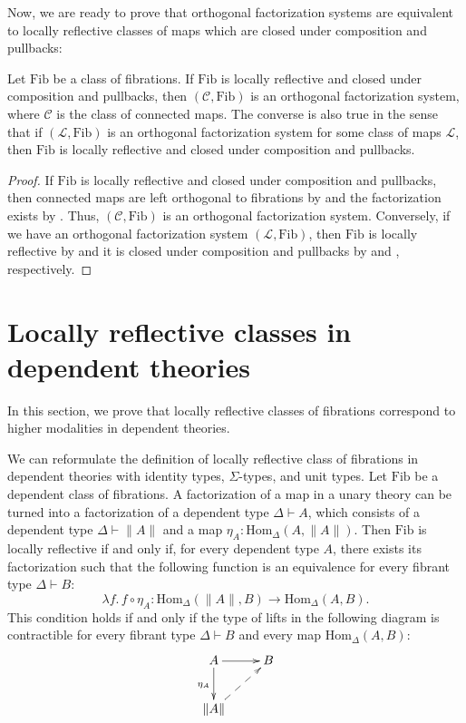 \documentclass[reqno]{mscs}
\newcommand{\ob}{}
\newcommand{\fs}[1]{\mathrm{#1}}
\newcommand{\Hom}{\fs{Hom}}
\newcommand{\Fib}{\fs{Fib}}
\numberwithin{figure}{section}
\begin{document}
Now, we are ready to prove that orthogonal factorization systems are equivalent to locally reflective classes of maps which are closed under composition and pullbacks:

\begin{thm}
Let $\Fib$ be a class of fibrations.
If $\Fib$ is locally reflective and closed under composition and pullbacks, then $(\mathcal{C},\Fib)$ is an orthogonal factorization system, where $\mathcal{C}$ is the class of connected maps.
The converse is also true in the sense that if $(\mathcal{L},\Fib)$ is an orthogonal factorization system for some class of maps $\mathcal{L}$, then $\Fib$ is locally reflective and closed under composition and pullbacks.
\end{thm}
\begin{proof}
If $\Fib$ is locally reflective and closed under composition and pullbacks, then connected maps are left orthogonal to fibrations by  and the factorization exists by .
Thus, $(\mathcal{C},\Fib)$ is an orthogonal factorization system.
Conversely, if we have an orthogonal factorization system $(\mathcal{L},\Fib)$, then $\Fib$ is locally reflective by  and it is closed under composition and pullbacks by  and , respectively.
\end{proof}

\section{Locally reflective classes in dependent theories}
\label{sec:refl-fib-dep}

In this section, we prove that locally reflective classes of fibrations correspond to higher modalities in dependent theories.

We can reformulate the definition of locally reflective class of fibrations in dependent theories with identity types, $\Sigma$-types, and unit types.
Let $\Fib$ be a dependent class of fibrations.
A factorization of a map in a unary theory can be turned into a factorization of a dependent type $\Delta \vdash A \ob$, which consists of a dependent type $\Delta \vdash \| A \| \ob$ and a map $\eta_A : \Hom_\Delta(A, \| A \|)$.
Then $\Fib$ is locally reflective if and only if, for every dependent type $A$, there exists its factorization such that the following function is an equivalence for every fibrant type $\Delta \vdash B \ob$:
\[ \lambda f.\, f \circ \eta_A : \Hom_\Delta(\| A \|, B) \to \Hom_\Delta(A, B). \]
This condition holds if and only if the type of lifts in the following diagram is contractible for every fibrant type $\Delta \vdash B \ob$ and every map $\Hom_\Delta(A,B)$:
\[ \xymatrix{ A \ar[r] \ar[d]_{\eta_A} & B \\
              \| A \| \ar@{-->}[ur]
            } \]
\end{document}
